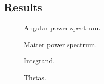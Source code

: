 \subsection{Results}\label{ssec:M4:results}


\begin{figure}[ht!]
    \caption{Angular power spectrum.}
    \label{fig:M4:results:cells_components}
\end{figure}



\begin{figure}[ht!]
    \caption{Matter power spectrum.}
    \label{fig:M4:results:matterPS_nk1000}
\end{figure}


\begin{figure}[ht!]
    \caption{Integrand.}
    \label{fig:M4:results:integrand_thetas}
\end{figure}


\begin{figure}[ht!]
    \caption{Thetas.}
    \label{fig:M4:results:thetas}
\end{figure}